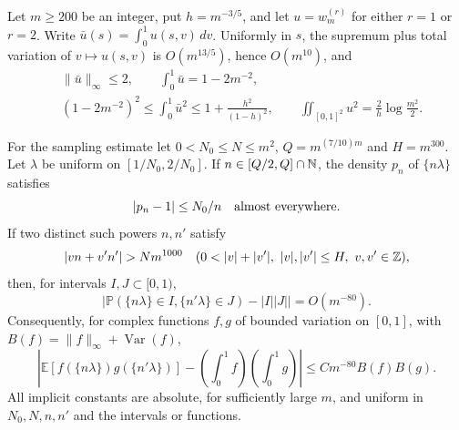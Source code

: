 \begin{lemma}\label{lem:scalar-sampling-estimates}
Let $m\ge200$ be an integer, put $h=m^{-3/5}$, and let
$u=w_m^{(r)}$ for either $r=1$ or $r=2$.  Write
$\bar u(s)=\int_0^1u(s,v)\,dv$.  Uniformly in $s$, the supremum plus
total variation of $v\mapsto u(s,v)$ is $O(m^{13/5})$, hence
$O(m^{10})$, and
\begin{equation}\label{eq:kernel-estimates}
 \begin{aligned}
 &\|\bar u\|_\infty\le2,\qquad
   \int_0^1\bar u=1-2m^{-2},\\
 &(1-2m^{-2})^2\le\int_0^1\bar u^2
       \le1+\frac{h^2}{(1-h)^2},\qquad
   \iint_{[0,1]^2}u^2=\frac2h\log\frac{m^2}{2}.
 \end{aligned}
\end{equation}

For the sampling estimate let $0<N_0\le N\le m^2$,
$Q=m^{(7/10)m}$ and $H=m^{300}$.  Let $\lambda$ be uniform on
$[1/N_0,2/N_0]$.  If $n\in[Q/2,Q]\cap\mathbb N$, the density $p_n$ of
$\{n\lambda\}$ satisfies
\begin{equation}\label{eq:scalar-marginal}
 |p_n-1|\le N_0/n\quad\hbox{almost everywhere}.
\end{equation}
If two distinct such powers $n,n'$ satisfy
\[
 |vn+v'n'|>Nm^{1000}
 \quad(0<|v|+|v'|,\ |v|,|v'|\le H,\ v,v'\in\Z),
\]
then, for intervals $I,J\subset[0,1)$,
\begin{equation}\label{eq:scalar-rectangles}
 \left|\mathbb P(\{n\lambda\}\in I,\{n'\lambda\}\in J)
             -|I||J|\right|=O(m^{-80}).
\end{equation}
Consequently, for complex functions $f,g$ of bounded variation on
$[0,1]$, with $B(f)=\|f\|_\infty+\operatorname{Var}(f)$,
\begin{equation}\label{eq:scalar-bv}
 \left|\mathbb E[f(\{n\lambda\})g(\{n'\lambda\})]
           -\left(\int_0^1f\right)\left(\int_0^1g\right)\right|
       \le C m^{-80}B(f)B(g).
\end{equation}
All implicit constants are absolute, for sufficiently large $m$,
and uniform in $N_0,N,n,n'$ and the intervals or functions.
\end{lemma}

